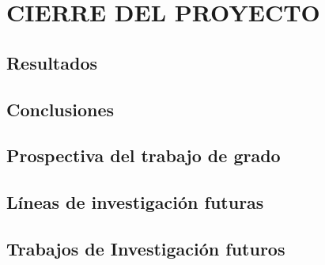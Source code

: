 \part{ CIERRE DEL PROYECTO}
\chapter{Resultados}
\chapter{Conclusiones}
\chapter{Prospectiva del trabajo de grado}
\chapter{Líneas de investigación futuras}
\chapter{Trabajos de Investigación futuros}


%
%
